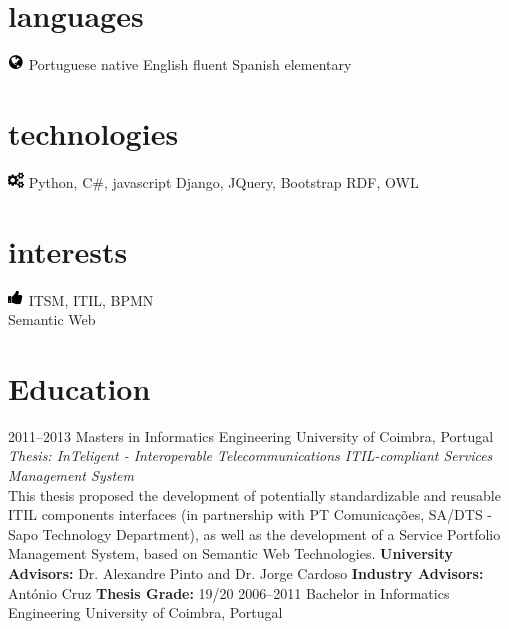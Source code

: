 \documentclass[]{friggeri-cv} %
\begin{document}
\begin{aside}
\section{languages}
\includegraphics[scale=0.5, left]{globe.png}
\vspace{-5mm} Portuguese native
English fluent
Spanish elementary
\section{technologies}
\includegraphics[scale=0.5, left]{cogs.png}
\vspace{-5mm}  Python, C\#, javascript
Django, JQuery, Bootstrap
RDF, OWL
\section{interests}
\includegraphics[scale=0.5, left]{like.png}
\vspace{-5mm} ITSM, ITIL, BPMN \\ Semantic Web
\end{aside}





\section{Education}

\begin{entrylist}
\entrymasters
{2011--2013}
{Masters {\normalfont in Informatics Engineering}}
{University of Coimbra, Portugal}
{\emph{Thesis: InTeligent - Interoperable Telecommunications ITIL-compliant Services Management System} \\ This thesis proposed the development of potentially standardizable and reusable ITIL components interfaces (in partnership with PT Comunicações, SA/DTS - Sapo Technology Department), as well as the development of a Service Portfolio Management System, based on Semantic Web Technologies.}
{\textbf{University Advisors:} Dr. Alexandre Pinto and Dr. Jorge Cardoso}
{\textbf{Industry Advisors:} António Cruz}
{\textbf{Thesis Grade:} 19/20}
\entrybachelor
{2006--2011}
{Bachelor {\normalfont in Informatics Engineering}}
{University of Coimbra, Portugal}
\end{entrylist}
\end{document}
